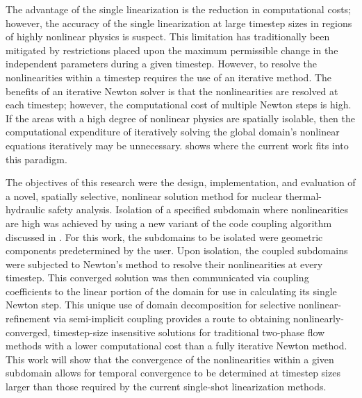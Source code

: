 The advantage of the single linearization is the reduction in computational costs; however, the accuracy of the single linearization at large timestep sizes in regions of highly nonlinear physics is suspect.
This limitation has traditionally been mitigated by restrictions placed upon the maximum permissible change in the independent parameters during a given timestep.
However, to resolve the nonlinearities within a timestep requires the use of an iterative method.
The benefits of an iterative Newton solver is that the nonlinearities are resolved at each timestep; however, the computational cost of multiple Newton steps is high.
If the areas with a high degree of nonlinear physics are spatially isolable, then the computational expenditure of iteratively solving the global domain's nonlinear equations iteratively may be unnecessary.
 shows where the current work fits into this paradigm.

The objectives of this research were the design, implementation, and evaluation of a novel, spatially selective, nonlinear solution method for nuclear thermal-hydraulic safety analysis.
Isolation of a specified subdomain where nonlinearities are high was achieved by using a new variant of the code coupling algorithm discussed in .
For this work, the subdomains to be isolated were geometric components predetermined by the user.
Upon isolation, the coupled subdomains were subjected to Newton's method to resolve their nonlinearities at every timestep.
This converged solution was then communicated via coupling coefficients to the linear portion of the domain for use in calculating its single Newton step.
This unique use of domain decomposition for selective nonlinear-refinement via semi-implicit coupling provides a route to obtaining nonlinearly-converged, timestep-size insensitive solutions for traditional two-phase flow methods with a lower computational cost than a fully iterative Newton method.
This work will show that the convergence of the nonlinearities within a given subdomain allows for temporal convergence to be determined at timestep sizes larger than those required by the current single-shot linearization methods.

